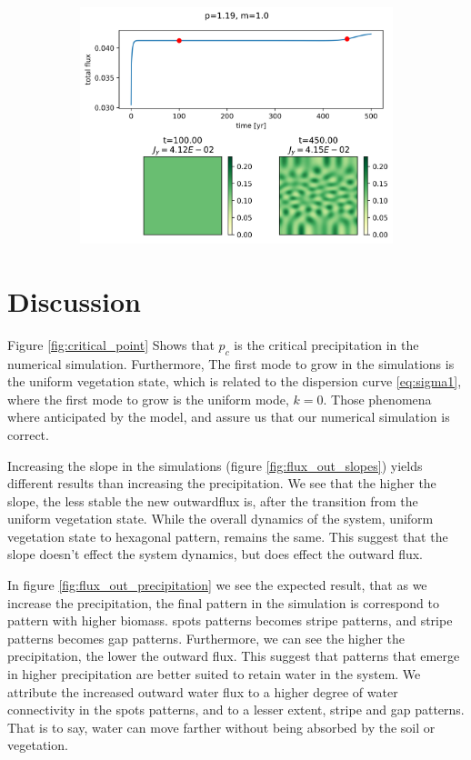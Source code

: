 \documentclass{article}
\numberwithin{equation}{section}
\begin{document}
\begin{figure}[!ht]
    \begin{subfigure}[]{0.5\textwidth}
        \centering
        \includegraphics[scale=0.5]{plots/p1_19_m1_0.png}
        \label{fig:p1_19}
    \end{subfigure}

\end{figure}

\section{Discussion}

Figure \ref{fig:critical_point} Shows that $p_c$ is the critical precipitation in the numerical simulation.
Furthermore, The first mode to grow in the simulations is the uniform vegetation state, which is related to the dispersion curve \ref{eq:sigma1}, where the first mode to grow is the uniform mode, $k=0$.
Those phenomena where anticipated by the model, and assure us that our numerical simulation is correct.

Increasing the slope in the simulations (figure \ref{fig:flux_out_slopes}) yields different results than increasing the precipitation. We see that the higher the slope, the less stable the new outwardflux is, after the transition from the uniform vegetation state. While the overall dynamics of the system, uniform vegetation state to hexagonal pattern, remains the same. This suggest that the slope doesn't effect the system dynamics, but does effect the outward flux.

In figure \ref{fig:flux_out_precipitation} we see the expected result, that as we increase the precipitation, the final pattern in the simulation is correspond to pattern with higher biomass.
spots patterns becomes stripe patterns, and stripe patterns becomes gap patterns.
Furthermore, we can see the higher the precipitation, the lower the outward flux.
This suggest that patterns that emerge in higher precipitation are better suited to retain water in the system.
We attribute the increased outward water flux to a higher degree of water connectivity in the spots patterns, and to a lesser extent, stripe and gap patterns.
That is to say, water can move farther without being absorbed by the soil or vegetation.
\end{document}
